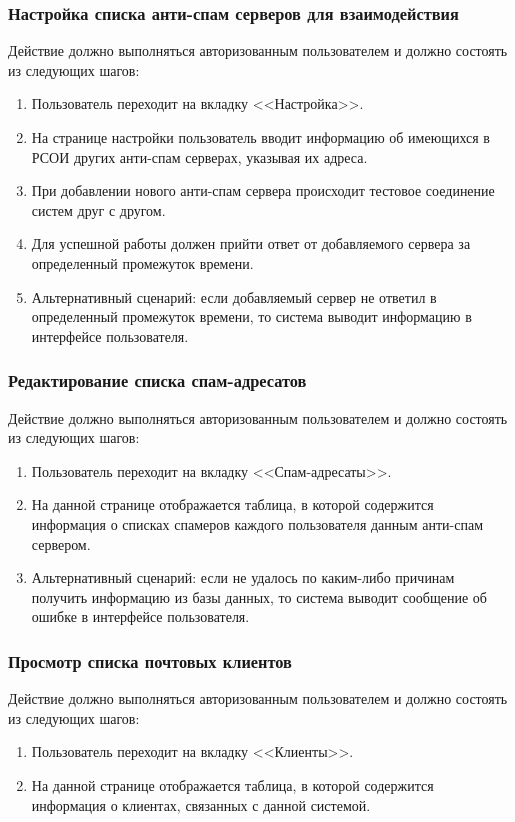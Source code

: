\subsubsection{Настройка списка анти-спам серверов для взаимодействия}
Действие должно выполняться авторизованным пользователем и должно состоять из следующих шагов:
\begin{enumerate}
  \item Пользователь переходит на вкладку <<Настройка>>.
  \item На странице настройки пользователь вводит информацию об имеющихся в РСОИ других анти-спам серверах, указывая их адреса.
  \item При добавлении нового анти-спам сервера происходит тестовое соединение систем друг с другом.
  \item Для успешной работы должен прийти ответ от добавляемого сервера за определенный промежуток времени.
  \item Альтернативный сценарий: если добавляемый сервер не ответил в определенный промежуток времени, то система выводит информацию в интерфейсе пользователя.
\end{enumerate}

\subsubsection{Редактирование списка спам-адресатов}
Действие должно выполняться авторизованным пользователем и должно состоять из следующих шагов:
\begin{enumerate}
  \item Пользователь переходит на вкладку <<Спам-адресаты>>.
  \item На данной странице отображается таблица, в которой содержится информация о списках спамеров каждого пользователя данным анти-спам сервером.
  \item Альтернативный сценарий: если не удалось по каким-либо причинам получить информацию из базы данных, то система выводит сообщение об ошибке в интерфейсе пользователя.
\end{enumerate}

\subsubsection{Просмотр списка почтовых клиентов}
Действие должно выполняться авторизованным пользователем и должно состоять из следующих шагов:
\begin{enumerate}
  \item Пользователь переходит на вкладку <<Клиенты>>.
  \item На данной странице отображается таблица, в которой содержится информация о клиентах, связанных с данной системой.
\end{enumerate}

